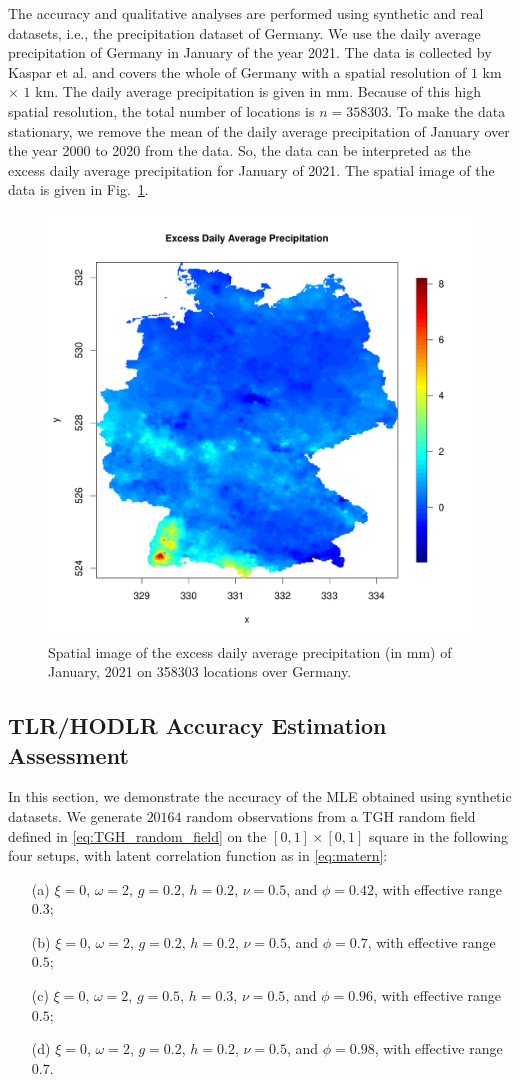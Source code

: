 \documentclass[conference]{IEEEtran}
\begin{document}
The accuracy and qualitative analyses are performed using synthetic and real datasets, i.e., the precipitation dataset of Germany. We use the daily average precipitation of Germany in January of the year 2021. The data is collected by Kaspar et al. \cite{kaspar2013monitoring} and covers the whole of Germany with a spatial resolution of $1$ km $\times$ $1$ km. The daily average precipitation is given in mm. Because of this high spatial resolution, the total number of locations is $n = 358303$. To make the data stationary, we remove the mean of the daily average precipitation of January over the year 2000 to 2020 from the data. So, the data can be interpreted as the excess daily average precipitation for January of 2021. The spatial image of the data is given in Fig.~\ref{fig:data_image}.
\begin{figure}[h]
\centering
\includegraphics[width=0.7\linewidth]{./figures/data_spatial_image.pdf}
  \caption{Spatial image of the excess daily average precipitation (in mm) of January, 2021 on 358303 locations over Germany.
}
  \label{fig:data_image}
\end{figure}

\subsection{TLR/HODLR Accuracy Estimation Assessment}
In this section, we demonstrate the accuracy of the MLE obtained using synthetic datasets. We generate $20164$ random observations from a TGH random field defined in \eqref{eq:TGH_random_field} on the  $[0,1]\times[0,1]$ square in the following four setups, with latent correlation function as in \eqref{eq:matern}:
\begin{enumerate}
\item[(a)] $\xi = 0$, $\omega = 2$, $g = 0.2$, $h = 0.2$, $\nu = 0.5$, and $\phi = 0.42$, with effective range $0.3$;
\item[(b)] $\xi = 0$, $\omega = 2$, $g = 0.2$, $h = 0.2$, $\nu = 0.5$, and $\phi = 0.7$, with effective range $0.5$;
\item[(c)] $\xi = 0$, $\omega = 2$, $g = 0.5$, $h = 0.3$, $\nu = 0.5$, and $\phi = 0.96$, with effective range $0.5$;
\item[(d)] $\xi = 0$, $\omega = 2$, $g = 0.2$, $h = 0.2$, $\nu = 0.5$, and $\phi = 0.98$, with effective range $0.7$.
\end{enumerate}
\end{document}
